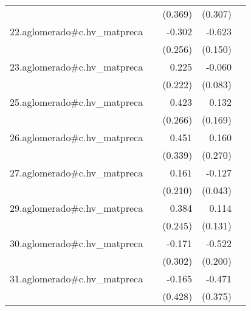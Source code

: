 {\begin{longtable}{l*{4}{D{.}{.}{-1}}}
            &                     &     (0.369)         &     (0.307)         &                     \\
\addlinespace
22.aglomerado#c.hv\_matpreca&                     &      -0.302         &      -0.623\sym{***}&                     \\
            &                     &     (0.256)         &     (0.150)         &                     \\
\addlinespace
23.aglomerado#c.hv\_matpreca&                     &       0.225         &      -0.060         &                     \\
            &                     &     (0.222)         &     (0.083)         &                     \\
\addlinespace
25.aglomerado#c.hv\_matpreca&                     &       0.423         &       0.132         &                     \\
            &                     &     (0.266)         &     (0.169)         &                     \\
\addlinespace
26.aglomerado#c.hv\_matpreca&                     &       0.451         &       0.160         &                     \\
            &                     &     (0.339)         &     (0.270)         &                     \\
\addlinespace
27.aglomerado#c.hv\_matpreca&                     &       0.161         &      -0.127\sym{**} &                     \\
            &                     &     (0.210)         &     (0.043)         &                     \\
\addlinespace
29.aglomerado#c.hv\_matpreca&                     &       0.384         &       0.114         &                     \\
            &                     &     (0.245)         &     (0.131)         &                     \\
\addlinespace
30.aglomerado#c.hv\_matpreca&                     &      -0.171         &      -0.522\sym{**} &                     \\
            &                     &     (0.302)         &     (0.200)         &                     \\
\addlinespace
31.aglomerado#c.hv\_matpreca&                     &      -0.165         &      -0.471         &                     \\
            &                     &     (0.428)         &     (0.375)         &                     \\

\end{longtable}}

